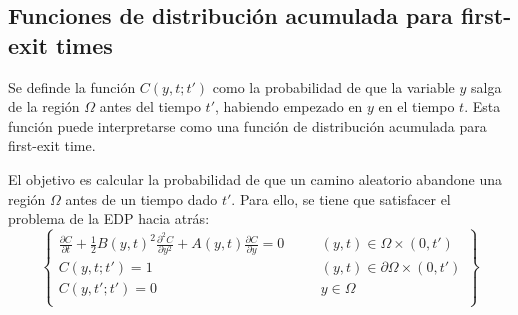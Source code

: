 \subsection{Funciones de distribución acumulada para first-exit times}
Se definde la función $C(y, t; t')$ como la probabilidad de que la variable $y$ salga de la región $\Omega$ antes del tiempo $t'$, habiendo empezado en $y$ en el tiempo $t$. Esta función puede interpretarse como una función de distribución acumulada para first-exit time. 

El objetivo es calcular la probabilidad de que un camino aleatorio abandone una región $\Omega$ antes de un tiempo dado $t'$. Para ello, se tiene que satisfacer el problema de la EDP hacia atrás:
\begin{equation}\label{eq:CumulatFirstExitTime}
    \left\{
    \begin{array}{rlrl}
        \displaystyle\frac{\partial C}{\partial t} + \frac{1}{2} B(y, t)^2 \frac{\partial^2 C}{\partial y^2} + A(y, t) \frac{\partial C}{\partial y} = 0 &\quad& (y,t) \in \Omega\times(0, t') \\[2ex]
        C(y, t; t') = 1 && (y,t) \in \partial\Omega\times(0, t') \\[2ex]
        C(y, t'; t') = 0 && y \in \Omega \\
    \end{array}
    \right\}
\end{equation}




